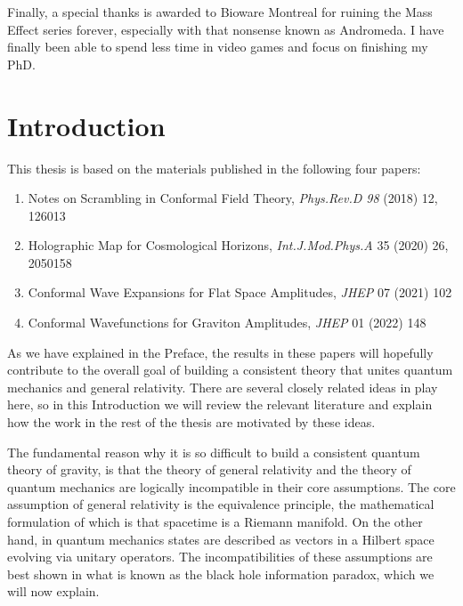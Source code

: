 \documentclass{brownthesis}
\begin{document}
Finally, a special thanks is awarded to Bioware Montreal for ruining the Mass Effect series forever, especially with that nonsense known as Andromeda. I have finally been able to spend less time in video games and focus on finishing my PhD.
\afterpreface

\chapter{Introduction}
This thesis is based on the materials published in the following four papers:
\begin{enumerate}
  \item{Notes on Scrambling in Conformal Field Theory, {\sl Phys.Rev.D 98} (2018) 12, 126013}
  \item{Holographic Map for Cosmological Horizons, {\sl Int.J.Mod.Phys.A} 35 (2020) 26, 2050158}
  \item{Conformal Wave Expansions for Flat Space Amplitudes, {\sl JHEP} 07 (2021) 102}
  \item{Conformal Wavefunctions for Graviton Amplitudes, {\sl JHEP} 01 (2022) 148}
\end{enumerate}
As we have explained in the Preface, the results in these papers will hopefully contribute to
the overall goal of building a consistent theory that unites quantum mechanics and general
relativity. There are several closely related ideas in play here, so in this Introduction
we will review the relevant literature and explain how the work in the rest of the thesis
are motivated by these ideas.

The fundamental reason why it is so difficult to build a consistent quantum theory of
gravity, is that the theory of general relativity and the theory of quantum mechanics
are logically incompatible in their core assumptions. The core assumption of general relativity
is the equivalence principle, the mathematical formulation of which is that spacetime
is a Riemann manifold. On the other hand, in quantum mechanics states are described
as vectors in a Hilbert space evolving via unitary operators. The incompatibilities of these
assumptions are best shown in what is known as the black hole information paradox, which we will
now explain.
\end{document}
